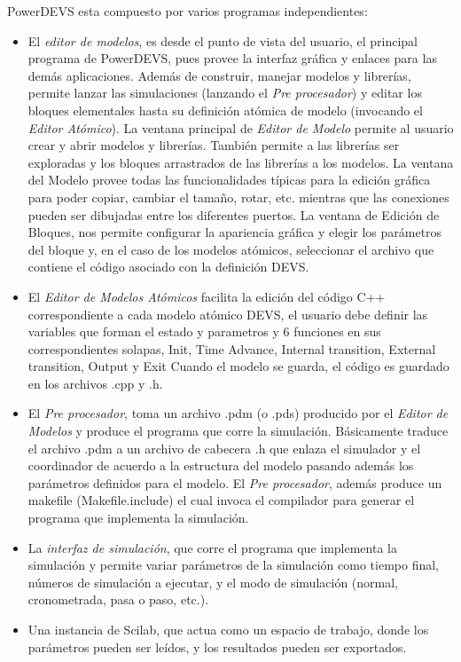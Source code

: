 	PowerDEVS esta compuesto por varios programas independientes:
	\begin{itemize}
		\item El \emph{editor de modelos}, es desde el punto de vista del usuario, el principal programa de PowerDEVS, pues provee la interfaz gráfica 
			y enlaces para las demás aplicaciones. 
		Además de construir, manejar modelos y librerías, permite lanzar las simulaciones (lanzando el \emph{Pre procesador}) y editar los bloques 
		elementales hasta su definición atómica de modelo (invocando el \emph{Editor Atómico}).
		La ventana principal de \emph{Editor de Modelo} permite al usuario crear y abrir modelos y librerías. También permite a las librerías ser 
		exploradas y los bloques arrastrados de las librerías a los modelos.
		La ventana del Modelo provee todas las funcionalidades típicas para la edición gráfica para poder copiar, cambiar el tamaño, rotar, etc. mientras 
		que las conexiones pueden ser dibujadas entre los diferentes puertos.
		La ventana de Edición de Bloques, nos permite configurar la apariencia gráfica y elegir los parámetros del bloque y, en el caso de los modelos 
		atómicos, seleccionar el archivo que contiene el código asociado con la definición DEVS.

		\item El \emph{Editor de Modelos Atómicos} facilita la edición del código C++ correspondiente a cada modelo atómico DEVS, el usuario debe 
		definir las variables que forman el estado y parametros y 6 funciones en sus correspondientes solapas, Init, Time Advance, Internal transition, 
		External transition, Output y Exit  
		Cuando el modelo se guarda, el código es guardado en los archivos .cpp y .h. 

		\item El \emph{Pre procesador}, toma un archivo .pdm (o .pds) producido por el \emph{Editor de Modelos} y produce el programa que corre 
		la simulación. Básicamente traduce el archivo .pdm a un archivo de cabecera .h que enlaza el simulador y el coordinador de acuerdo a la 
		estructura del modelo pasando además los parámetros definidos para el modelo.
		El \emph{Pre procesador}, además produce un makefile (Makefile.include) el cual invoca el compilador para generar el programa que implementa 
		la simulación.

		\item La \emph{interfaz de simulación}, que corre el programa que implementa la simulación y permite variar parámetros de la simulación 
		como tiempo final, números de simulación a ejecutar, y el modo de simulación (normal, cronometrada, pasa o paso, etc.).

		\item Una instancia de Scilab, que actua como un espacio de trabajo, donde los parámetros pueden ser leídos, y los resultados pueden ser exportados.
	\end{itemize}


